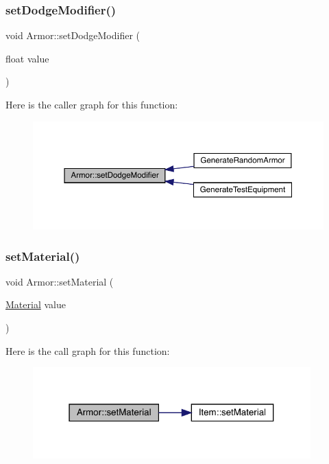 \subsubsection{\texorpdfstring{set\+Dodge\+Modifier()}{setDodgeModifier()}}
{\footnotesize\ttfamily void Armor\+::set\+Dodge\+Modifier (\begin{DoxyParamCaption}\item[{float}]{value }\end{DoxyParamCaption})}

Here is the caller graph for this function\+:
\nopagebreak
\begin{figure}[H]
\begin{center}
\leavevmode
\includegraphics[width=350pt]{d9/d76/class_armor_ab48309e3f16d226d56af617c65350698_icgraph}
\end{center}
\end{figure}
\mbox{\label{class_armor_a1710521cbba1bf9328e969cbbc8cdbf3}} 
\subsubsection{\texorpdfstring{set\+Material()}{setMaterial()}}
{\footnotesize\ttfamily void Armor\+::set\+Material (\begin{DoxyParamCaption}\item[{\mbox{\hyperlink{class_material}{Material}}}]{value }\end{DoxyParamCaption})}

Here is the call graph for this function\+:
\nopagebreak
\begin{figure}[H]
\begin{center}
\leavevmode
\includegraphics[width=304pt]{d9/d76/class_armor_a1710521cbba1bf9328e969cbbc8cdbf3_cgraph}
\end{center}
\end{figure}
\mbox{\label{class_armor_a99475fc688add41f89b7fef160534e33}} 
